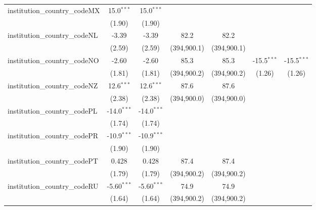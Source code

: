 \begin{tabular}{lcccccc}
   institution\_country\_codeMX          & 15.0$^{***}$  & 15.0$^{***}$  &               &               &               &   \\   
                                         & (1.90)        & (1.90)        &               &               &               &   \\   
   institution\_country\_codeNL          & -3.39         & -3.39         & 82.2          & 82.2          &               &   \\   
                                         & (2.59)        & (2.59)        & (394,900.1)   & (394,900.1)   &               &   \\   
   institution\_country\_codeNO          & -2.60         & -2.60         & 85.3          & 85.3          & -15.5$^{***}$ & -15.5$^{***}$\\   
                                         & (1.81)        & (1.81)        & (394,900.2)   & (394,900.2)   & (1.26)        & (1.26)\\   
   institution\_country\_codeNZ          & 12.6$^{***}$  & 12.6$^{***}$  & 87.6          & 87.6          &               &   \\   
                                         & (2.38)        & (2.38)        & (394,900.0)   & (394,900.0)   &               &   \\   
   institution\_country\_codePL          & -14.0$^{***}$ & -14.0$^{***}$ &               &               &               &   \\   
                                         & (1.74)        & (1.74)        &               &               &               &   \\   
   institution\_country\_codePR          & -10.9$^{***}$ & -10.9$^{***}$ &               &               &               &   \\   
                                         & (1.90)        & (1.90)        &               &               &               &   \\   
   institution\_country\_codePT          & 0.428         & 0.428         & 87.4          & 87.4          &               &   \\   
                                         & (1.79)        & (1.79)        & (394,900.2)   & (394,900.2)   &               &   \\   
   institution\_country\_codeRU          & -5.60$^{***}$ & -5.60$^{***}$ & 74.9          & 74.9          &               &   \\   
                                         & (1.64)        & (1.64)        & (394,900.2)   & (394,900.2)   &               &   \\   

\end{tabular}

